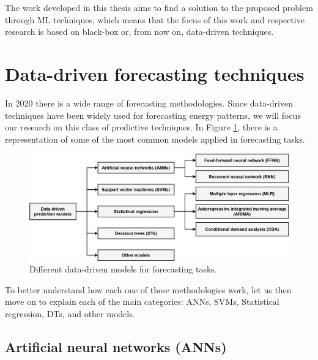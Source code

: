 The work developed in this thesis aims to find a solution to the proposed problem through \ac{ML} techniques, which means that the focus of this work and respective research is based on black-box or, from now on, data-driven techniques.

\section{Data-driven forecasting techniques\label{b}}

In 2020 there is a wide range of forecasting methodologies. Since data-driven techniques have been widely used for forecasting energy patterns, we will focus our research on this class of predictive techniques. In Figure \ref{datamodels}, there is a representation of some of the most common models applied in forecasting tasks.

\begin{figure}[h!]
    \centering
    \begin{center}
    \includegraphics[width=1\textwidth]{Images/data-drive prediction models.png}
    \caption{Different data-driven models for forecasting tasks.}
    \label{datamodels}
    \end{center}
\end{figure}

To better understand how each one of these methodologies work, let us then move on to explain each of the main categories: \acf{ANNs}, \acf{SVMs}, Statistical regression, \acf{DTs}, and other models.


\subsection{Artificial neural networks (ANNs)}

